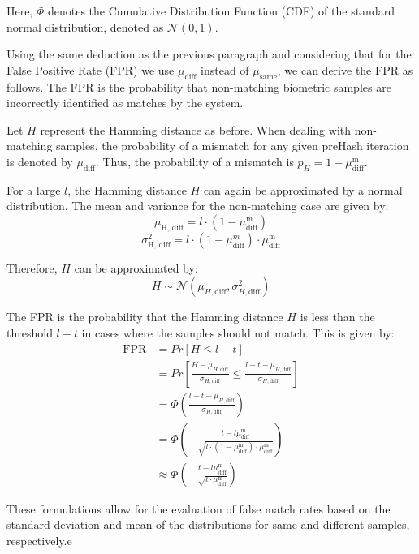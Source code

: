 Here, \(\Phi\) denotes the Cumulative Distribution Function (CDF) of the standard normal distribution, denoted as \(\mathcal{N}(0, 1)\).

Using the same deduction as the previous paragraph and considering that for the False Positive Rate (FPR) we use \(\mu_{\text{diff}}\) instead of \(\mu_{\text{same}}\), we can derive the FPR as follows. The FPR is the probability that non-matching biometric samples are incorrectly identified as matches by the system. 

Let \( H \) represent the Hamming distance as before. When dealing with non-matching samples, the probability of a mismatch for any given preHash iteration is denoted by \( \mu_{\text{diff}} \). Thus, the probability of a mismatch is \( p_H = 1 - \mu_{\text{diff}}^\text{m} \).

For a large \( l \), the Hamming distance \( H \) can again be approximated by a normal distribution. The mean and variance for the non-matching case are given by:
\[
\mu_{\text{H, diff}} = l \cdot (1 - \mu_{\text{diff}}^\text{m})
\]
\[
\sigma_{\text{H, diff}}^\text{2} = l \cdot (1 - \mu_{\text{diff}}^m) \cdot \mu_{\text{diff}}^\text{m}
\]

Therefore, \( H \) can be approximated by:
\[
H \sim \mathcal{N}(\mu_{H, \text{diff}}, \sigma_{H, \text{diff}}^\text{2})
\]

The FPR is the probability that the Hamming distance \( H \) is less than the threshold \( l - t \) in cases where the samples should not match. This is given by:
\begin{equation}
\begin{aligned}
    \label{eq:fpr}
    \text{FPR} &= Pr[H \leq l - t] \\
    &= Pr\left[\frac{H - \mu_{H, \text{diff}}}{\sigma_{H, \text{diff}}} \leq \frac{l - t - \mu_{H, \text{diff}}}{\sigma_{H, \text{diff}}}\right] \\
    &= \Phi\left(\frac{l - t - \mu_{H, \text{diff}}}{\sigma_{H, \text{diff}}}\right) \\
    &= \Phi\left(-\frac{t - l\mu_{\text{diff}}^\text{m}}{\sqrt{l \cdot (1 - \mu_{\text{diff}}^\text{m}) \cdot \mu_{\text{diff}}^\text{m}}}\right)\\
    &\approx\Phi\left(-\frac{t - l\mu_{\text{diff}}^\text{m}}{\sqrt{l\cdot \mu_{\text{diff}}^\text{m}}}\right)
\end{aligned}
\end{equation}

These formulations allow for the evaluation of false match rates based on the standard deviation and mean of the distributions for same and different samples, respectively.e

